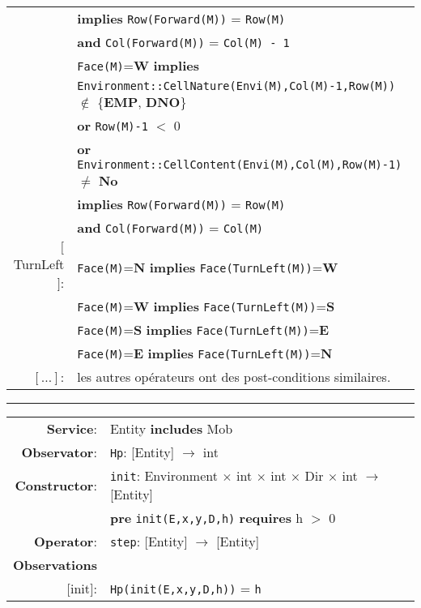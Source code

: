 \documentclass{article}
\begin{document}
\begin{tabular}{rl}
& \quad\quad\quad\quad \textbf{implies} \texttt{Row(Forward(M))} = \texttt{Row(M)} \\
& \quad\quad\quad\quad \textbf{and} \texttt{Col(Forward(M))} = \texttt{Col(M) - 1} \\
& \texttt{Face(M)}=\textbf{W} \textbf{implies} \\
& \quad\quad\quad\quad \texttt{Environment::CellNature(Envi(M),Col(M)-1,Row(M))} $\notin$ \{\textbf{EMP}, \textbf{DNO}\} \\
& \quad\quad\quad\quad \textbf{or} \texttt{Row(M)-1} $<$ 0 \\
& \quad\quad\quad\quad \textbf{or} \texttt{Environment::CellContent(Envi(M),Col(M),Row(M)-1)} $\neq$ \textbf{No} \\
& \quad\quad\quad\quad \textbf{implies} \texttt{Row(Forward(M))} = \texttt{Row(M)} \\
& \quad\quad\quad\quad \textbf{and} \texttt{Col(Forward(M))} = \texttt{Col(M)} \\
$[$TurnLeft$]$: & \texttt{Face(M)}=\textbf{N} \textbf{implies} \texttt{Face(TurnLeft(M))}=\textbf{W} \\
& \texttt{Face(M)}=\textbf{W} \textbf{implies} \texttt{Face(TurnLeft(M))}=\textbf{S} \\
& \texttt{Face(M)}=\textbf{S} \textbf{implies} \texttt{Face(TurnLeft(M))}=\textbf{E} \\
& \texttt{Face(M)}=\textbf{E} \textbf{implies} \texttt{Face(TurnLeft(M))}=\textbf{N} \\
$[\dots]$: & les autres opérateurs ont des post-conditions similaires.
\end{tabular}

\vspace{5mm}\hrule\vspace{5mm}

\begin{tabular}{rl}
\textbf{Service}: & Entity \textbf{includes} Mob \\
\textbf{Observator}: & \texttt{Hp}: \textrm{[Entity]} $\rightarrow$ \textrm{int} \\
\textbf{Constructor}: & \texttt{init}: \textrm{Environment} $\times$ \textrm{int} $\times$ \textrm{int} $\times$ \textrm{Dir} $\times$ \textrm{int} $\rightarrow$ \textrm{[Entity]} \\
& \quad\quad\quad\quad\textbf{pre} \texttt{init(E,x,y,D,h)} \textbf{requires} h $>$ 0 \\
\textbf{Operator}: & \texttt{step}: \textrm{[Entity]} $\rightarrow$ \textrm{[Entity]} \\
\textbf{Observations} & \\
$[$init$]$: & \texttt{Hp(init(E,x,y,D,h))} = \texttt{h}
\end{tabular}
\end{document}
